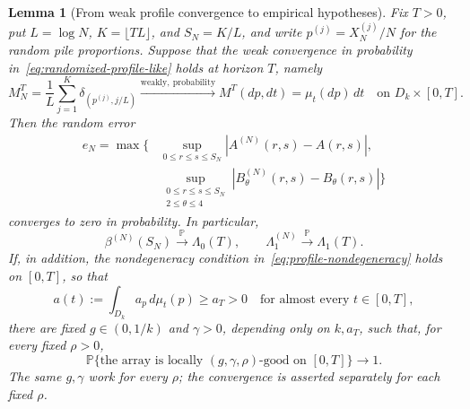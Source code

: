 \documentclass[11pt]{article}
\numberwithin{equation}{section}
\newtheorem{lemma}[theorem]{Lemma}
\theoremstyle{definition}
\theoremstyle{remark}
\newcommand{\Pp}{\mathbb P}
\newcommand{\1}{\mathbf 1}
\begin{document}
\begin{lemma}[From weak profile convergence to empirical hypotheses]
\label{lem:randomized-profile-inputs}
Fix $T>0$, put $L=\log N$, $K=\lfloor TL\rfloor$, and
$S_N=K/L$, and write $p^{(j)}=X_N^{(j)}/N$ for the random pile
proportions. Suppose that the weak convergence in probability
in~\eqref{eq:randomized-profile-like} holds at horizon $T$, namely
\[
 M_N^T=\frac1L\sum_{j=1}^K\delta_{(p^{(j)},j/L)}
 \xrightarrow{\mathrm{weakly,\ probability}}
 M^T(dp,dt)=\mu_t(dp)\,dt
 \quad\text{on }D_k\times[0,T].
\]
Then the random error
\begin{align*}
 e_N=\max\bigg\{&
 \sup_{0\le r\le s\le S_N}|A^{(N)}(r,s)-A(r,s)|,\\
 &\sup_{\substack{0\le r\le s\le S_N\\2\le\theta\le4}}
       |B_\theta^{(N)}(r,s)-B_\theta(r,s)|\bigg\}
\end{align*}
converges to zero in probability. In particular,
\begin{equation}\label{eq:random-profile-margin-convergence}
 \beta^{(N)}(S_N)\xrightarrow{\mathbb P}\Lambda_0(T),
 \qquad
 \Lambda_1^{(N)}\xrightarrow{\mathbb P}\Lambda_1(T).
\end{equation}
If, in addition, the nondegeneracy condition
in~\eqref{eq:profile-nondegeneracy} holds on $[0,T]$, so that
\[
 a(t):=\int_{D_k}a_p\,d\mu_t(p)\ge a_T>0
 \quad\text{for almost every }t\in[0,T],
\]
there are fixed $g\in(0,1/k)$ and $\gamma>0$, depending only on
$k,a_T$, such that, for every fixed $\rho>0$,
\begin{equation}\label{eq:random-profile-local-good}
 \Pp\{\text{the array is locally }(g,\gamma,\rho)
                  \text{-good on }[0,T]\}\longrightarrow1.
\end{equation}
The same $g,\gamma$ work for every $\rho$; the convergence is asserted
separately for each fixed $\rho$.
\end{lemma}
\end{document}
